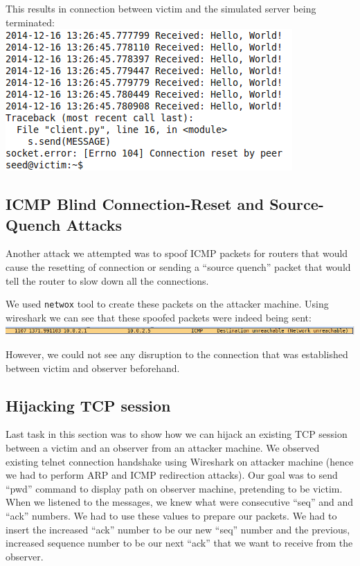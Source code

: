 \documentclass[12pt, a4paper]{article}
\begin{document}
This results in connection between victim and the simulated server being terminated:\\
\includegraphics[width=.95\textwidth]{gfx/python.png}

\subsection{ICMP Blind Connection-Reset and Source-Quench Attacks}

Another attack we attempted was to spoof ICMP packets for routers that would cause the resetting of connection or sending a ``source quench'' packet that would tell the router to slow down all the connections.

We used \texttt{netwox} tool to create these packets on the attacker machine.
Using wireshark we can see that these spoofed packets were indeed being sent:\\

\includegraphics[width=.95\textwidth]{gfx/unrechable.png}

However, we could not see any disruption to the connection that was established between victim and observer beforehand.


\subsection{Hijacking TCP session}

Last task in this section was to show how we can hijack an existing TCP session
between a victim and an observer from an attacker machine. We observed existing telnet
connection handshake using Wireshark on attacker machine (hence we had to perform ARP and ICMP redirection attacks).
Our goal was to send ``pwd'' command to display path on observer machine, pretending to be victim. When we listened to the
messages, we knew what were consecutive ``seq'' and and ``ack'' numbers. We had to use these values to prepare our packets. We had to insert
the increased ``ack'' number to be our new ``seq'' number and the previous, increased sequence number to be our next ``ack'' that we want to receive from the observer.\\
\end{document}
